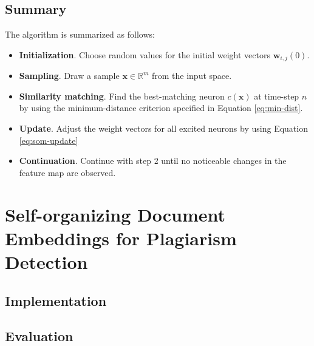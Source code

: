 \documentclass[english]{lni}
\begin{document}
\subsection{Summary}
The algorithm is summarized as follows:
\begin{itemize}
    \item \textbf{Initialization}. Choose random values for the initial weight vectors 
    $\mathbf{w}_{i, j}(0)$.
    \item \textbf{Sampling}. Draw a sample $\mathbf{x} \in \mathbb{R}^{m}$ from the input space.
    \item \textbf{Similarity matching}. Find the best-matching neuron $c(\mathbf{x})$ at 
    time-step $n$ by using the minimum-distance criterion specified in Equation \ref{eq:min-dist}.
    \item \textbf{Update}. Adjust the weight vectors for all excited neurons by using 
    Equation \ref{eq:som-update} 
    \item \textbf{Continuation}. Continue with step 2 until no noticeable changes in the feature map are observed. 
\end{itemize}
\clearpage
\section{Self-organizing Document Embeddings for Plagiarism Detection}
\subsection{Implementation}
\subsection{Evaluation}

\end{document}
